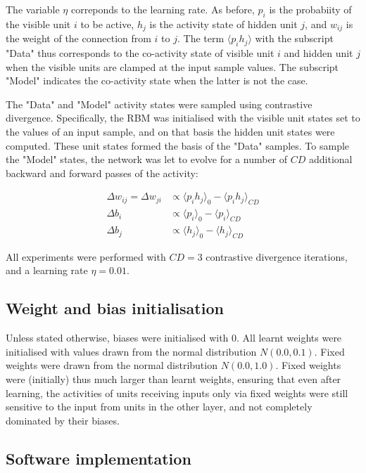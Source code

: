 \documentclass[11pt]{article}
\begin{document}
The variable $\eta$ correponds to the learning rate. As before, $p_i$ is
the probabiity of the visible unit $i$ to be active, $h_j$ is the
activity state of hidden unit $j$, and $w_{ij}$ is the weight of the
connection from $i$ to $j$. The term $\langle p_{i}h_{j} \rangle$ with the
subscript "Data" thus corresponds to the co-activity state of visible
unit $i$ and hidden unit $j$ when the visible units are clamped at the
input sample values. The subscript "Model" indicates the co-activity
state when the latter is not the case.

The "Data" and "Model" activity states were sampled using contrastive
divergence. Specifically, the RBM was initialised with the visible
unit states set to the values of an input sample, and on that basis
the hidden unit states were computed. These unit states formed the
basis of the "Data" samples. To sample the "Model" states, the network
was let to evolve for a number of $CD$ additional backward and forward
passes of the activity:

\begin{align}
  \label{eq:rbm_update_equations}
  \Delta w_{ij} = \Delta w_{ji} &\propto \langle p_{i}h_{j} \rangle_{0} - \langle p_{i}h_{j} \rangle_{CD} \\
  \Delta b_{i}                  &\propto \langle p_{i}      \rangle_{0} - \langle p_{i}      \rangle_{CD} \\
  \Delta b_{j}                  &\propto \langle h_{j}      \rangle_{0} - \langle h_{j}      \rangle_{CD}
\end{align}

All experiments were performed with $CD=3$ contrastive divergence
iterations, and a learning rate $\eta = 0.01$.

\subsection{Weight and bias initialisation}

Unless stated otherwise, biases were initialised with 0. All learnt
weights were initialised with values drawn from the normal
distribution $N(0.0, 0.1)$. Fixed weights were drawn from the normal
distribution $N(0.0, 1.0)$. Fixed weights were (initially) thus much
larger than learnt weights, ensuring that even after learning, the
activities of units receiving inputs only via fixed weights were still
sensitive to the input from units in the other layer, and not
completely dominated by their biases.

\subsection{Software implementation}
\end{document}
